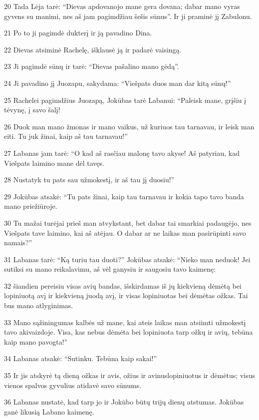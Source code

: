 \par 20 Tada Lėja tarė: “Dievas apdovanojo mane gera dovana; dabar mano vyras gyvens su manimi, nes aš jam pagimdžiau šešis sūnus”. Ir ji praminė jį Zabulonu. 
\par 21 Po to ji pagimdė dukterį ir ją pavadino Dina. 
\par 22 Dievas atsiminė Rachelę, išklausė ją ir padarė vaisingą. 
\par 23 Ji pagimdė sūnų ir tarė: “Dievas pašalino mano gėdą”. 
\par 24 Ji pavadino jį Juozapu, sakydama: “Viešpats duos man dar kitą sūnų!” 
\par 25 Rachelei pagimdžius Juozapą, Jokūbas tarė Labanui: “Paleisk mane, grįšiu į tėvynę, į savo šalį! 
\par 26 Duok man mano žmonas ir mano vaikus, už kuriuos tau tarnavau, ir leisk man eiti. Tu juk žinai, kaip aš tau tarnavau!” 
\par 27 Labanas jam tarė: “O kad aš rasčiau malonę tavo akyse! Aš patyriau, kad Viešpats laimino mane dėl tavęs. 
\par 28 Nustatyk tu pats sau užmokestį, ir aš tau jį duosiu!” 
\par 29 Jokūbas atsakė: “Tu pats žinai, kaip tau tarnavau ir kokia tapo tavo banda mano priežiūroje. 
\par 30 Tu mažai turėjai prieš man atvykstant, bet dabar tai smarkiai padaugėjo, nes Viešpats tave laimino, kai aš atėjau. O dabar ar ne laikas man pasirūpinti savo namais?” 
\par 31 Labanas tarė: “Ką turiu tau duoti?” Jokūbas atsakė: “Nieko man neduok! Jei sutiksi su mano reikalavimu, aš vėl ganysiu ir saugosiu tavo kaimenę: 
\par 32 šiandien pereisiu visas avių bandas, išskirdamas iš jų kiekvieną dėmėtą bei lopiniuotą avį ir kiekvieną juodą avį, ir visas lopiniuotas bei dėmėtas ožkas. Tai bus mano atlyginimas. 
\par 33 Mano sąžiningumas kalbės už mane, kai ateis laikas man atsiimti užmokestį tavo akivaizdoje. Visa, kas nebus dėmėta bei lopiniuota tarp ožkų ir avių, tebūna kaip mano pavogta!” 
\par 34 Labanas atsakė: “Sutinku. Tebūna kaip sakai!” 
\par 35 Ir jis atskyrė tą dieną ožkas ir avis, ožius ir avinus­lopiniuotus ir dėmėtus; visus vienos spalvos gyvulius atidavė savo sūnums. 
\par 36 Labanas nustatė, kad tarp jo ir Jokūbo būtų trijų dienų atstumas. Jokūbas ganė likusią Labano kaimenę. 
